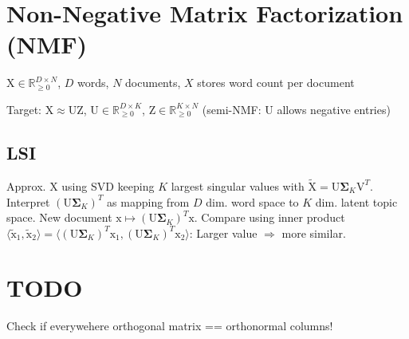 \documentclass[a4paper, 11pt, landscape]{article}
\newcommand{\matr}[1]{\boldsymbol{\mathrm{#1}}}
\begin{document}
\begin{multicols*}{3}
\section{Non-Negative Matrix Factorization (NMF)}
\begin{inparaitem}
	\item $\matr{X} \in \mathbb{R}^{D \times N}_{\geq 0}$, $D$ words, $N$ documents, $X$ stores word count per document
	\item Target: $\matr{X} \approx \matr{UZ}$, $\matr{U} \in \mathbb{R}^{D \times K}_{\geq 0}$, $\matr{Z} \in \mathbb{R}^{K \times N}_{\geq 0}$ (semi-NMF: $\matr{U}$ allows negative entries)
\end{inparaitem}

\subsection{LSI}
Approx. $\matr{X}$ using SVD keeping $K$ largest singular values with $\tilde{\matr{X}} = \matr{U} \boldsymbol{\Sigma}_K \matr{V}^T$. Interpret $(\matr{U} \boldsymbol{\Sigma}_K)^T$ as mapping from $D$ dim. word space to $K$ dim. latent topic space. New document $\matr{x} \mapsto (\matr{U} \boldsymbol{\Sigma}_K)^T \matr{x}$. Compare using inner product $\langle \tilde{\matr{x}}_1, \tilde{\matr{x}}_2 \rangle = \langle (\matr{U} \boldsymbol{\Sigma}_K)^T \matr{x}_1, (\matr{U} \boldsymbol{\Sigma}_K)^T \matr{x}_2 \rangle$: Larger value $\Rightarrow$ more similar.



\section{TODO}
Check if everywehere orthogonal matrix == orthonormal columns!



\raggedcolumns
\end{multicols*}
\end{document}
